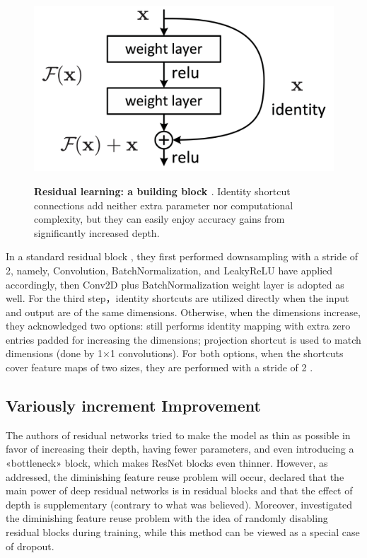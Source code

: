 \begin{figure}[t]
\begin{center}
\centering
\includegraphics[width=\textwidth]{thesis-template-master/images/RES.png}
\label{fig:cellnet}

\end{center}
\caption{\textbf{Residual learning: a building block \cite{20}}. Identity shortcut connections add neither extra parameter nor computational complexity, but they can easily enjoy accuracy gains from significantly increased depth.}
\end{figure}


In a standard residual block \cite{20}, they first performed downsampling with a stride of 2, namely, Convolution, BatchNormalization, and  LeakyReLU have applied accordingly, then Conv2D plus BatchNormalization weight layer is adopted as well. For the third step，identity shortcuts are utilized directly when the input and output are of the same dimensions. Otherwise, when the dimensions increase, they acknowledged two options:  still performs identity mapping with extra zero entries padded for increasing the dimensions; projection shortcut is used to match dimensions (done by 1×1 convolutions). For both options, when the shortcuts cover feature maps of two sizes, they are performed with a stride of 2 \cite{20}.


\subsection{ Variously increment Improvement }

The authors of residual networks\cite{20} tried to make the model as thin as possible in favor of increasing their depth, having fewer parameters, and even introducing a «bottleneck» block, which makes ResNet blocks even thinner. However, as \cite{wideres}  addressed, the diminishing feature reuse problem will occur, \cite{wideres} declared that the main power of deep residual networks is in residual blocks and that the effect of depth is supplementary (contrary to what was believed). Moreover, \cite{stochasticres} investigated the diminishing feature reuse problem with the idea of randomly disabling residual blocks during training, while this method can be viewed as a special case of dropout\cite{dropout}.

